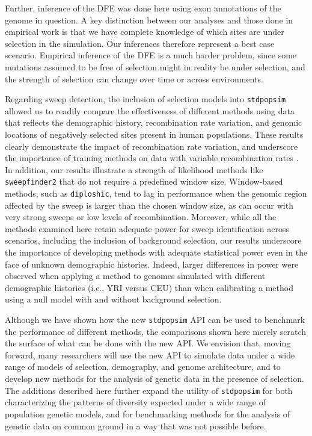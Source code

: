 \documentclass[hidelinks]{article}
\newcommand{\stdpopsim}{\texttt{stdpopsim}\xspace}
\newcommand{\sweepfinder}{\texttt{sweepfinder2}\xspace}
\newcommand{\diploshic}{\texttt{diploshic}\xspace}
\begin{document}
    Further, inference of the DFE was done here using exon annotations of the genome in question.
    A key distinction between our analyses and those done in empirical work 
    is that we have complete knowledge of which sites are under selection in the simulation.
    Our inferences therefore represent a best case scenario. Empirical inference of the DFE is a much
    harder problem, since some mutations assumed to be free of selection
    might in reality be under selection, and the strength of selection can change over time or across environments.

    Regarding sweep detection, the inclusion of selection models into \stdpopsim allowed us to readily compare the
    effectiveness of different methods using data that reflects the demographic history, recombination rate variation,
    and genomic locations of negatively selected sites present in human populations. These results clearly demonstrate
    the impact of recombination rate variation, and underscore the importance of training methods on data with variable
    recombination rates \citep[e.g.,][]{schrider2017soft}. In addition, our results
    illustrate a strength of likelihood methods like \sweepfinder that do not require a predefined window size.
    Window-based methods, such as \diploshic, tend to lag in performance when the genomic region affected by the sweep is
    larger than the chosen window size, as can occur with very strong sweeps or low levels of
    recombination. Moreover, while all the methods examined here retain adequate power for sweep identification across
    scenarios, including the inclusion of background selection, our results underscore the importance of developing
    methods with adequate statistical power even in the face of unknown demographic histories. Indeed, larger differences
    in power were observed when applying a method to genomes simulated with different demographic histories (i.e., YRI versus CEU)
    than when calibrating a method using a null model with and without background selection.

    Although we have shown how the new \stdpopsim API can be used to benchmark the performance of different methods,
    the comparisons shown here merely scratch the surface of what can be done with the new API.
    We envision that, moving forward, many researchers will use
    the new API to simulate data under a wide range of models of selection, demography, and genome architecture, and to develop
    new methods for the analysis of genetic data in the presence of selection.
    The additions described here further expand the utility of \stdpopsim for both
    characterizing the patterns of diversity expected under a wide range of population genetic
    models, and for benchmarking methods for the analysis of genetic data
    on common ground in a way that was not possible before. 
\end{document}
